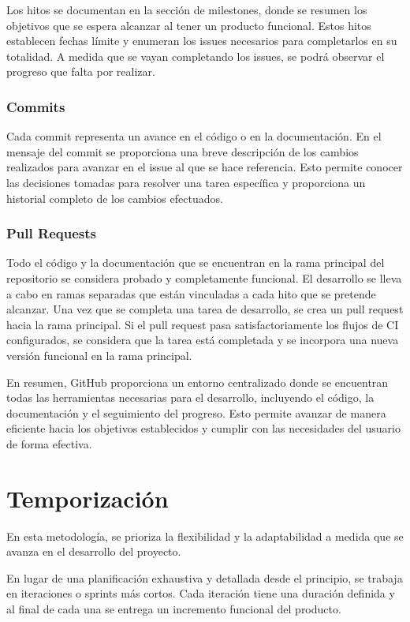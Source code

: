 Los hitos se documentan en la sección de milestones, donde se resumen los objetivos que se espera alcanzar al tener un producto funcional. Estos hitos establecen fechas límite y enumeran los issues necesarios para completarlos en su totalidad. A medida que se vayan completando los issues, se podrá observar el progreso que falta por realizar.

\subsubsection{Commits}

Cada commit representa un avance en el código o en la documentación. En el mensaje del commit se proporciona una breve descripción de los cambios realizados para avanzar en el issue al que se hace referencia. Esto permite conocer las decisiones tomadas para resolver una tarea específica y proporciona un historial completo de los cambios efectuados.

\subsubsection{Pull Requests}

Todo el código y la documentación que se encuentran en la rama principal del repositorio se considera probado y completamente funcional. El desarrollo se lleva a cabo en ramas separadas que están vinculadas a cada hito que se pretende alcanzar. Una vez que se completa una tarea de desarrollo, se crea un pull request hacia la rama principal. Si el pull request pasa satisfactoriamente los flujos de CI configurados, se considera que la tarea está completada y se incorpora una nueva versión funcional en la rama principal.


En resumen, GitHub proporciona un entorno centralizado donde se encuentran todas las herramientas necesarias para el desarrollo, incluyendo el código, la documentación y el seguimiento del progreso. Esto permite avanzar de manera eficiente hacia los objetivos establecidos y cumplir con las necesidades del usuario de forma efectiva.

\section{Temporización}

En esta metodología, se prioriza la flexibilidad y la adaptabilidad a medida que se avanza en el desarrollo del proyecto.

En lugar de una planificación exhaustiva y detallada desde el principio, se trabaja en iteraciones o sprints más cortos. Cada iteración tiene una duración definida y al final de cada una se entrega un incremento funcional del producto.

